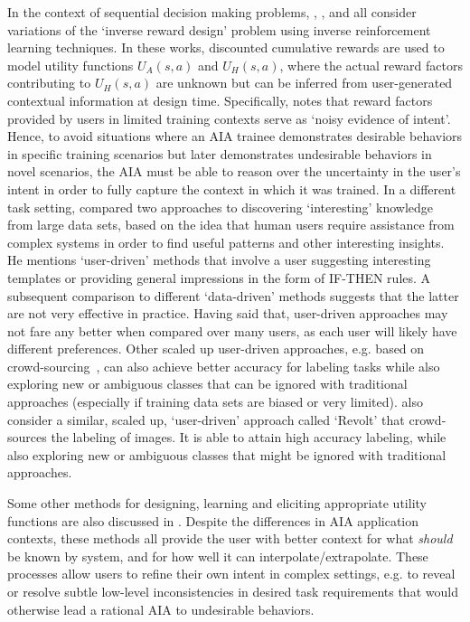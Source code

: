 In the context of sequential decision making problems, \citet{Hadfield-Menell2017-tl}, \citet{Hadfield-Menell2016-ws}, and \citet{Huang2017-lk} all consider variations of the `inverse reward design' problem using inverse reinforcement learning techniques. In these works, discounted cumulative rewards are used to model utility functions $U_A(s,a)$ and $U_H(s,a)$, where the actual reward factors contributing to $U_H(s,a)$ are unknown but can be inferred from user-generated contextual information at design time. Specifically, \cite{Hadfield-Menell2017-tl} notes that reward factors provided by users in limited training contexts serve as `noisy evidence of intent'. Hence, to avoid situations where an AIA trainee demonstrates desirable behaviors in specific training scenarios but later demonstrates undesirable behaviors in novel scenarios, the AIA must be able to reason over the uncertainty in the user's intent in order to fully capture the context in which it was trained. 
In a different task setting, \citet{Freitas2006-qo} compared two approaches to discovering `interesting' knowledge from large data sets, based on the idea that human users require assistance from complex systems in order to find useful patterns and other interesting insights. He mentions `user-driven' methods that involve a user suggesting interesting templates or providing general impressions in the form of IF-THEN rules. A subsequent comparison to different `data-driven' methods suggests that the latter are not very effective in practice. 
Having said that, user-driven approaches may not fare any better when compared over many users, as each user will likely have different preferences. Other scaled up user-driven approaches, e.g. based on crowd-sourcing~\citet{Chang2017-kl}, can also achieve better accuracy for labeling tasks while also exploring new or ambiguous classes that can be ignored with traditional approaches (especially if training data sets are biased or very limited). \citet{Chang2017-kl} also consider a similar, scaled up, `user-driven' approach called `Revolt' that crowd-sources the labeling of images. It is able to attain high accuracy labeling, while also exploring new or ambiguous classes that might be ignored with traditional approaches. 

Some other methods for designing, learning and eliciting appropriate utility functions are also discussed in \cite{Hadfield-Menell2016-ws,Da_Veiga2012-gh,Garcia2015-rs}.
Despite the differences in AIA application contexts, these methods all provide the user with better context for what \emph{should} be known by system, and for how well it can interpolate/extrapolate. 
These processes allow users to refine their own intent in complex settings, e.g. to reveal or resolve subtle low-level inconsistencies in desired task requirements that would otherwise lead a rational AIA to undesirable behaviors. 

